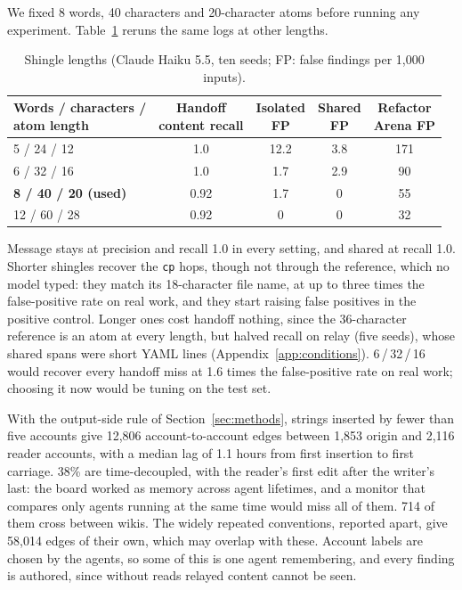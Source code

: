 We fixed 8 words, 40 characters and 20-character atoms before running any experiment. Table~\ref{tab:sweep} reruns the same logs at other lengths.

\begin{table}[h]
\centering\small
\caption{Shingle lengths (Claude Haiku 5.5, ten seeds; FP: false findings per 1,000 inputs).}\label{tab:sweep}
\begin{tabular}{lcccc}
\toprule
\makecell{Words / characters /\\atom length} & \makecell{Handoff\\content recall} & \makecell{Isolated\\FP} & \makecell{Shared\\FP} & \makecell{Refactor\\Arena FP} \\
\midrule
5 / 24 / 12 & 1.0 & 12.2 & 3.8 & 171 \\
6 / 32 / 16 & 1.0 & 1.7 & 2.9 & 90 \\
\textbf{8 / 40 / 20 (used)} & 0.92 & 1.7 & 0 & 55 \\
12 / 60 / 28 & 0.92 & 0 & 0 & 32 \\
\bottomrule
\end{tabular}
\end{table}

Message stays at precision and recall 1.0 in every setting, and shared at recall 1.0. Shorter shingles recover the \texttt{cp} hops, though not through the reference, which no model typed: they match its 18-character file name, at up to three times the false-positive rate on real work, and they start raising false positives in the positive control. Longer ones cost handoff nothing, since the 36-character reference is an atom at every length, but halved recall on relay (five seeds), whose shared spans were short YAML lines (Appendix~\ref{app:conditions}). 6\,/\,32\,/\,16 would recover every handoff miss at 1.6 times the false-positive rate on real work; choosing it now would be tuning on the test set.

 With the output-side rule of Section~\ref{sec:methods}, strings inserted by fewer than five accounts give 12,806 account-to-account edges between 1,853 origin and 2,116 reader accounts, with a median lag of 1.1 hours from first insertion to first carriage. 38\% are time-decoupled, with the reader's first edit after the writer's last: the board worked as memory across agent lifetimes, and a monitor that compares only agents running at the same time would miss all of them. 714 of them cross between wikis. The widely repeated conventions, reported apart, give 58,014 edges of their own, which may overlap with these. Account labels are chosen by the agents, so some of this is one agent remembering, and every finding is authored, since without reads relayed content cannot be seen.

